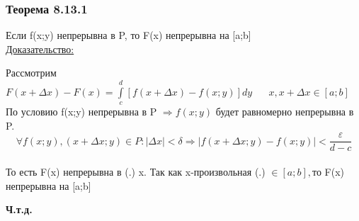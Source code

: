 \documentclass[12pt]{article}
\let\oldint\int
\renewcommand{\int}{\oldint\limits}
\begin{document}
  \subsubsection*{Теорема 8.13.1}\label{th:8.13.1}
  \par\noindent
  Если f(x;y) непрерывна в P, то F(x) непрерывна на [a;b]\\
  \underline{Доказательство:}
  \begin{adjustwidth}{1.5em}{1.5em}
    Рассмотрим $F(x+\Delta x)-F(x)=\int_{c}^{d}[f(x+\Delta x)-f(x;y)]dy \hspace{20pt} x,x+\Delta x \in [a;b]$\\
    По условию f(x;y) непрерывна в P $\Rightarrow f(x;y)$ будет равномерно непрерывна в P. \[\forall f(x;y)
    ,(x+\Delta x;y)\in P: |\Delta x|<\delta \Rightarrow |f(x+\Delta x;y)-f(x;y)|< \frac{\varepsilon}{d-c}\]\\
    То есть F(x) непрерывна в (.) x. Так как x-произвольная (.) $\in [a;b],$то F(x) непрерывна на [a;b]
    \begin{center}
      \textbf{Ч.т.д.}
    \end{center}
  \end{adjustwidth}
\end{document}
